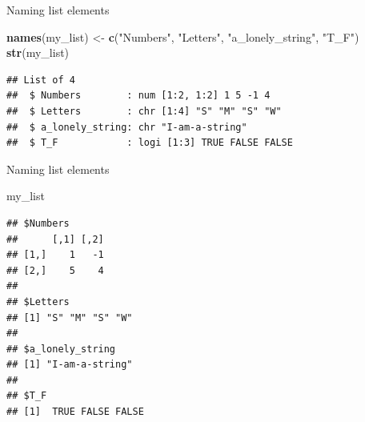 \documentclass[ignorenonframetext,]{beamer}
\newenvironment{Shaded}{\begin{snugshade}}{\end{snugshade}}
\newcommand{\KeywordTok}[1]{\textcolor[rgb]{0.13,0.29,0.53}{\textbf{#1}}}
\newcommand{\NormalTok}[1]{#1}
\newcommand{\StringTok}[1]{\textcolor[rgb]{0.31,0.60,0.02}{#1}}
\begin{document}
\begin{frame}[fragile]{Naming list elements}
\protect\hypertarget{naming-list-elements}{}

\begin{Shaded}
\begin{Highlighting}[]
\KeywordTok{names}\NormalTok{(my_list) <-}\StringTok{ }\KeywordTok{c}\NormalTok{(}\StringTok{"Numbers"}\NormalTok{, }\StringTok{"Letters"}\NormalTok{,}
                    \StringTok{"a_lonely_string"}\NormalTok{, }\StringTok{"T_F"}\NormalTok{)}
\KeywordTok{str}\NormalTok{(my_list)}
\end{Highlighting}
\end{Shaded}

\begin{verbatim}
## List of 4
##  $ Numbers        : num [1:2, 1:2] 1 5 -1 4
##  $ Letters        : chr [1:4] "S" "M" "S" "W"
##  $ a_lonely_string: chr "I-am-a-string"
##  $ T_F            : logi [1:3] TRUE FALSE FALSE
\end{verbatim}

\end{frame}

\begin{frame}[fragile]{Naming list elements}
\protect\hypertarget{naming-list-elements-1}{}

\begin{Shaded}
\begin{Highlighting}[]
\NormalTok{my_list}
\end{Highlighting}
\end{Shaded}

\begin{verbatim}
## $Numbers
##      [,1] [,2]
## [1,]    1   -1
## [2,]    5    4
## 
## $Letters
## [1] "S" "M" "S" "W"
## 
## $a_lonely_string
## [1] "I-am-a-string"
## 
## $T_F
## [1]  TRUE FALSE FALSE
\end{verbatim}

\end{frame}
\end{document}
